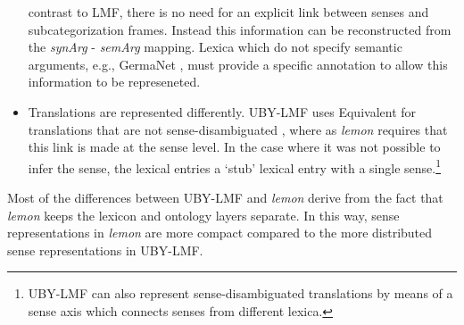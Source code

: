 \begin{itemize}
contrast to LMF, there is no need for an explicit link between senses and
subcategorization frames. Instead this information  can be 
reconstructed from the \emph{synArg} - \emph{semArg} mapping.
Lexica which do not specify semantic arguments, e.g., GermaNet \cite{Kunze02},
must provide a specific annotation to allow this information to be represeneted.
\item Translations are represented differently. UBY-LMF uses Equivalent for 
  translations that are not sense-disambiguated \cite{TC32012}, where as
  \emph{lemon} requires that this link is made at the sense level. In the case
  where it was not possible to infer the sense, the lexical entries a `stub'
  lexical entry with a single sense.\footnote{UBY-LMF can also represent sense-disambiguated 
    translations by means of a sense axis which connects senses from different
  lexica.}
\end{itemize}
Most of the differences between UBY-LMF and \emph{lemon} derive from the fact that 
\emph{lemon} keeps the lexicon and ontology layers separate. In this way, sense representations in
\emph{lemon} are more compact compared to the more distributed sense representations in UBY-LMF.


    
